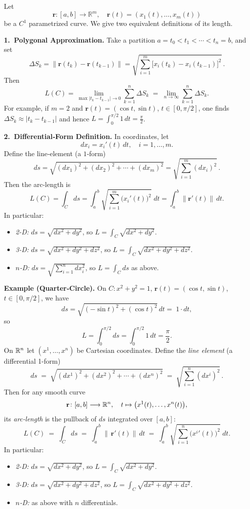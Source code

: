 \documentclass[11pt,openany]{article}
\begin{document}
Let 
\[
\mathbf r\colon [a,b]\to\mathbb R^m,\quad
\mathbf r(t)=(x_1(t),\dots,x_m(t))
\]
be a $C^1$ parametrized curve.  We give two equivalent definitions of its length.

\bigskip

\noindent\textbf{1.\ Polygonal Approximation.}  Take a partition 
\(
a=t_0<t_1<\cdots<t_n=b
\),
and set
\[
\Delta S_k
=\bigl\|\mathbf r(t_k)-\mathbf r(t_{k-1})\bigr\|
=\sqrt{\sum_{i=1}^m\bigl[x_i(t_k)-x_i(t_{k-1})\bigr]^2}\,.
\]
Then
\[
L(C)
=\lim_{\max|t_k-t_{k-1}|\to0}
\sum_{k=1}^n\Delta S_k
\;=\;
\lim_{n\to\infty}\sum_{k=1}^n\Delta S_k.
\]
For example, if $m=2$ and 
\(\mathbf r(t)=(\cos t,\sin t)\), $t\in[0,\pi/2]$, one finds 
\(\Delta S_k\approx|t_k-t_{k-1}|\) and hence 
$L=\int_0^{\pi/2}1\,dt=\tfrac\pi2$.

\bigskip

\noindent\textbf{2.\ Differential‐Form Definition.}  In coordinates, let
\[
dx_i = x_i'(t)\,dt,
\quad
i=1,\dots,m.
\]
Define the line‐element (a $1$‐form)
\[
ds
=\sqrt{(dx_1)^2+(dx_2)^2+\cdots+(dx_m)^2}
=\sqrt{\sum_{i=1}^m (dx_i)^2}\,.
\]
Then the arc‐length is
\[
L(C)
=\int_C ds
=\int_a^b \sqrt{\sum_{i=1}^m \bigl(x_i'(t)\bigr)^2}\;dt
=\int_a^b \bigl\|\mathbf r'(t)\bigr\|\,dt.
\]
In particular:
\begin{itemize}
	\item \emph{2-D:} $ds=\sqrt{dx^2+dy^2}$, so 
	$L=\int_C\sqrt{dx^2+dy^2}$.  
	
	\item \emph{3-D:} $ds=\sqrt{dx^2+dy^2+dz^2}$, so 
	$L=\int_C\sqrt{dx^2+dy^2+dz^2}$.
	
	\item \emph{$n$-D:} $ds=\sqrt{\sum_{i=1}^n dx_i^2}$, so 
	$L=\int_Cds$ as above.
\end{itemize}

\bigskip

\noindent\textbf{Example (Quarter‐Circle).}  On $C\!:x^2+y^2=1$, 
$\mathbf r(t)=(\cos t,\sin t)$, $t\in[0,\pi/2]$, we have
\[
ds
=\sqrt{(-\sin t)^2+(\cos t)^2}\,dt
=\;1\cdot dt,
\]
so
\[
L
=\int_0^{\pi/2}ds
=\int_0^{\pi/2}1\,dt
=\frac\pi2.
\]
\newpage
On \(\mathbb{R}^n\) let \((x^1,\dots,x^n)\) be Cartesian coordinates.  Define the \emph{line element} (a differential 1-form)
\[
\boxed{
	ds \;=\;\sqrt{(dx^1)^2+(dx^2)^2+\cdots+(dx^n)^2}
	\;=\;\sqrt{\sum_{i=1}^n(dx^i)^2}\,.
}
\]
Then for any smooth curve
\[
\mathbf r\colon [a,b]\longrightarrow\mathbb{R}^n,
\quad
t\mapsto \bigl(x^1(t),\dots,x^n(t)\bigr),
\]
its \emph{arc‐length} is the pullback of \(ds\) integrated over \([a,b]\):
\[
\boxed{
	L(C)
	\;=\;
	\int_C ds
	\;=\;
	\int_a^b \bigl\|\,\mathbf r'(t)\bigr\|\,dt
	\;=\;
	\int_a^b \sqrt{\sum_{i=1}^n \bigl(x^i{}'(t)\bigr)^2}\;dt.
}
\]
In particular:
\begin{itemize}
	\item \emph{2-D:} \(ds=\sqrt{dx^2+dy^2}\), so 
	\(\displaystyle L=\int_C\sqrt{dx^2+dy^2}\).
	\item \emph{3-D:} \(ds=\sqrt{dx^2+dy^2+dz^2}\), so 
	\(\displaystyle L=\int_C\sqrt{dx^2+dy^2+dz^2}\).
	\item \emph{\(n\)-D:} as above with \(n\) differentials.
\end{itemize}
\end{document}
